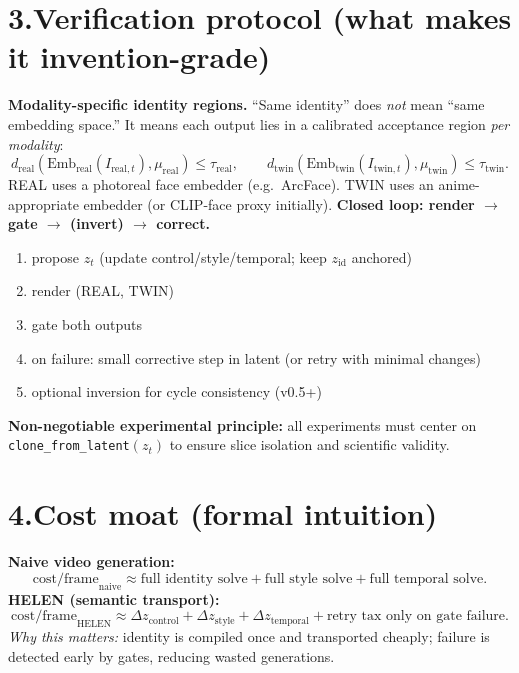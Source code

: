 \documentclass[10pt]{article}
\begin{document}
\section*{3.\;Verification protocol (what makes it invention-grade)}
\vspace{-0.25em}
\noindent\textbf{Modality-specific identity regions.}
``Same identity'' does \emph{not} mean ``same embedding space.'' It means each output lies in a calibrated acceptance region \emph{per modality}:
\[
d_{\text{real}}\!\left(\mathrm{Emb}_{\text{real}}(I_{\text{real},t}),\mu_{\text{real}}\right)\le \tau_{\text{real}},
\qquad
d_{\text{twin}}\!\left(\mathrm{Emb}_{\text{twin}}(I_{\text{twin},t}),\mu_{\text{twin}}\right)\le \tau_{\text{twin}}.
\]
REAL uses a photoreal face embedder (e.g.\ ArcFace). TWIN uses an anime-appropriate embedder (or CLIP-face proxy initially).
\vspace{0.25em}
\noindent\textbf{Closed loop: render $\to$ gate $\to$ (invert) $\to$ correct.}
\begin{enumerate}[leftmargin=1.6em,itemsep=0.15em,topsep=0.2em]
\item propose $z_t$ (update control/style/temporal; keep $z_{\mathrm{id}}$ anchored)
\item render (REAL, TWIN)
\item gate both outputs
\item on failure: small corrective step in latent (or retry with minimal changes)
\item optional inversion for cycle consistency (v0.5+)
\end{enumerate}
\noindent\textbf{Non-negotiable experimental principle:} all experiments must center on \texttt{clone\_from\_latent}$(z_t)$ to ensure slice isolation and scientific validity.
\section*{4.\;Cost moat (formal intuition)}
\vspace{-0.25em}
\noindent\textbf{Naive video generation:}
\[
\mathrm{cost/frame}_{\text{naive}} \approx
\text{full identity solve}+\text{full style solve}+\text{full temporal solve}.
\]
\noindent\textbf{HELEN (semantic transport):}
\[
\mathrm{cost/frame}_{\text{HELEN}} \approx
\Delta z_{\mathrm{control}} + \Delta z_{\mathrm{style}} + \Delta z_{\mathrm{temporal}}
+ \text{retry tax only on gate failure}.
\]
\noindent\emph{Why this matters:} identity is compiled once and transported cheaply; failure is detected early by gates, reducing wasted generations.
\end{document}
